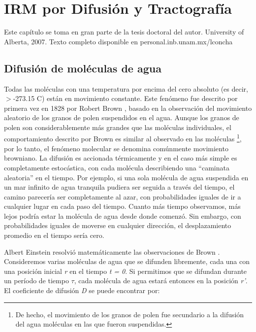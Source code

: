 \documentclass[12pt,a5,twoside]{book}
\begin{document}
\clearpage
\thispagestyle{plain}

\newpage
\chapter{IRM por Difusión y Tractografía}

Este capítulo se toma en gran parte de la tesis doctoral del autor. University of Alberta, 2007. Texto completo disponible en personal.inb.unam.mx/lconcha

\section{Difusión de moléculas de agua}

Todas las moléculas con una temperatura por encima del cero absoluto (es decir, $>$-273.15 \textdegree{}C) están en movimiento constante. Este fenómeno fue descrito por primera vez en 1828 por Robert Brown \citep{Brown_1828}, basado en la observación del movimiento aleatorio de los granos de polen suspendidos en el agua. Aunque los granos de polen son considerablemente más grandes que las moléculas individuales, el comportamiento descrito por Brown es similar al observado en las moléculas \footnote{De hecho, el movimiento de los granos de polen fue secundario a la difusión del agua moléculas en las que fueron suspendidas.}, por lo tanto, el fenómeno molecular se denomina comúnmente movimiento browniano. La difusión es accionada térmicamente y en el caso más simple es completamente estocástica, con cada molécula describiendo una ``caminata aleatoria'' en el tiempo. Por ejemplo, si una sola molécula de agua suspendida en un mar infinito de agua tranquila pudiera ser seguida a través del tiempo, el camino parecería ser completamente al azar, con probabilidades iguales de ir a cualquier lugar en cada paso del tiempo. Cuanto más tiempo observamos, más lejos podría estar la molécula de agua desde donde comenzó. Sin embargo, con probabilidades iguales de moverse en cualquier dirección, el desplazamiento promedio en el tiempo sería cero.

Albert Einstein resolvió matemáticamente las observaciones de Brown \citep{Einstein_1905}. Consideremos varias moléculas de agua que se difunden libremente, cada una con una posición inicial {\it r} en el tiempo {\it t = 0}. Si permitimos que se difundan durante un período de tiempo \(\tau\), cada molécula de agua estará entonces en la posición {\it r'}. El coeficiente de difusión {\it D} se puede encontrar por:
\end{document}
